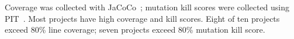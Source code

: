 

Coverage was collected with JaCoCo~\cite{jacoco2026}; mutation kill scores were collected using PIT~\cite{pitest2026}. 
Most projects have high coverage and kill scores. Eight of ten projects exceed 80\% line coverage; seven projects exceed 80\% mutation kill score.

